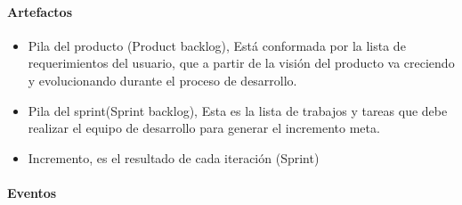\paragraph{Artefactos}

\begin{itemize}
    \item Pila del producto (Product backlog), Está conformada por la lista de requerimientos del usuario, que a partir de la visión del producto va creciendo y evolucionando durante el proceso de desarrollo.
    \item Pila del sprint(Sprint backlog), Esta es la lista de trabajos y tareas que debe realizar el equipo de desarrollo para generar el incremento meta. 
    \item Incremento, es el resultado de cada iteración (Sprint)
\end{itemize}


\paragraph{Eventos}